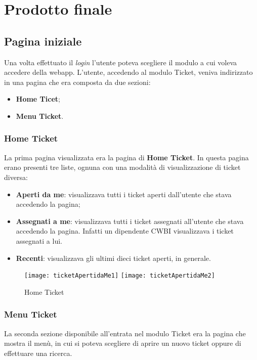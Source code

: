 \chapter{Prodotto finale}
\label{cap:prodotto finale}

\section{Pagina iniziale}
Una volta effettuato il \textit{login} l'utente poteva scegliere il modulo a cui voleva accedere della webapp. L'utente, accedendo al modulo Ticket, veniva indirizzato in una pagina che era composta da due sezioni:
\begin{itemize}
\item \textbf{Home Ticet};
\item \textbf{Menu Ticket}.
\end{itemize}

\subsection{Home Ticket}
La prima pagina visualizzata era la pagina di \textbf{Home Ticket}. In questa pagina erano presenti tre liste, ognuna con una modalità di visualizzazione di ticket diversa:
\begin{itemize}
\item \textbf{Aperti da me}: visualizzava tutti i ticket aperti dall'utente che stava accedendo la pagina;
\item \textbf{Assegnati a me}: visualizzava tutti i ticket assegnati all'utente che stava accedendo la pagina. Infatti un dipendente CWBI visualizzava i ticket assegnati a lui.
\item \textbf{Recenti}: visualizzava gli ultimi dieci ticket aperti, in generale.
\end{itemize}

\begin{figure}[H]
	\centering
    \texttt{[image: ticketApertidaMe1]} 
    \texttt{[image: ticketApertidaMe2]} 
    \caption{Home Ticket}
\end{figure}

\subsection{Menu Ticket}
La seconda sezione disponibile all'entrata nel modulo Ticket era la pagina che mostra il menù, in cui si poteva scegliere di aprire un nuovo ticket oppure di effettuare una ricerca.
 
